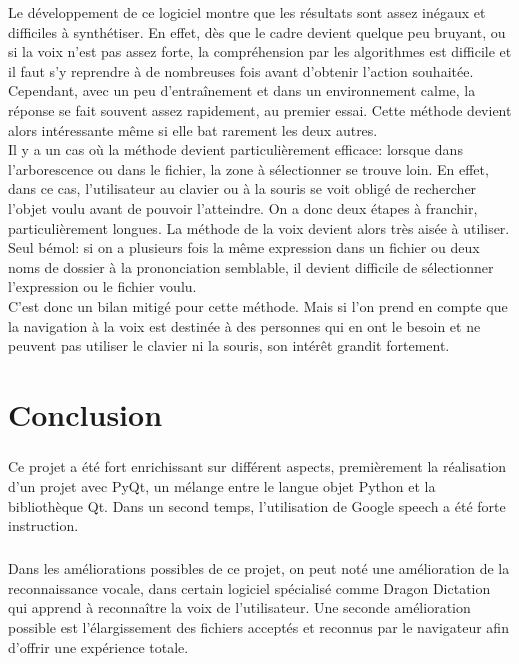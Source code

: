 \documentclass[a4paper, 11pt]{report}
\begin{document}
		Le développement de ce logiciel montre que les résultats sont assez inégaux et difficiles à synthétiser. En effet, dès que le cadre devient quelque peu bruyant, ou si la voix n'est pas assez forte, la compréhension par les algorithmes est difficile et il faut s'y reprendre à de nombreuses fois avant d'obtenir l'action souhaitée.\\
		Cependant, avec un peu d'entra\^inement et dans un environnement calme, la réponse se fait souvent assez rapidement, au premier essai. Cette méthode devient alors intéressante m\^eme si elle bat rarement les deux autres.\\
		Il y a un cas où la méthode devient particulièrement efficace: lorsque dans l'arborescence ou dans le fichier, la zone à sélectionner se trouve loin. En effet, dans ce cas, l'utilisateur au clavier ou à la souris se voit obligé de rechercher l'objet voulu avant de pouvoir l'atteindre. On a donc deux étapes à franchir, particulièrement longues. La méthode de la voix devient alors très aisée à utiliser.\\
		Seul bémol: si on a plusieurs fois la même expression dans un fichier ou deux noms de dossier à la prononciation semblable, il devient difficile de sélectionner l'expression ou le fichier voulu.\\
		C'est donc un bilan mitigé pour cette méthode. Mais si l'on prend en compte que la navigation à la voix est destinée à des personnes qui en ont le besoin et ne peuvent pas utiliser le clavier ni la souris, son intérêt grandit fortement.
		
		\chapter*{Conclusion}
        
        \paragraph{}
        Ce projet a été fort enrichissant sur différent aspects, premièrement la réalisation d'un
        projet avec PyQt, un mélange entre le langue objet Python et la bibliothèque Qt.  Dans un
        second temps, l'utilisation de Google speech a été forte instruction. 
        \paragraph{}
        Dans les améliorations possibles de ce projet, on peut noté une amélioration de la
        reconnaissance vocale, dans certain logiciel spécialisé comme Dragon Dictation qui apprend à
        reconnaître la voix de l'utilisateur. Une seconde amélioration possible est l'élargissement
        des fichiers acceptés et reconnus par le navigateur afin d'offrir une  expérience totale.
\end{document}

